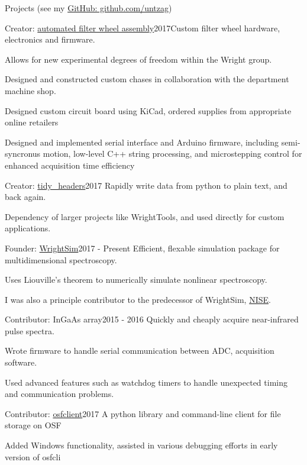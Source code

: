 \documentclass{resume}  %
\begin{document}
\begin{rSection}{Projects (see my \href{https://github.com/untzag}{GitHub: github.com/untzag})}
\begin{rSubsection}{Creator: \href{https://github.com/wright-group/FilterWheels}{automated filter
        wheel assembly}}{2017}{Custom filter wheel hardware, electronics and firmware.}{}
    \item Allows for new experimental degrees of freedom within the Wright group.
    \item Designed and constructed custom chases in collaboration with the department machine shop.
    \item Designed custom circuit board using KiCad, ordered supplies from appropriate online
      retailers
    \item Designed and implemented serial interface and Arduino firmware, including semi-syncronus
      motion, low-level C++ string processing, and microstepping control for enhanced acquisition
      time efficiency
  \end{rSubsection}
  \begin{rSubsection}{Creator: \href{https://github.com/untzag/tidy_headers}{tidy\_headers}}{2017}
    {Rapidly write data from python to plain text, and back again.}{}
    \item Dependency of larger projects like WrightTools, and used directly for custom
      applications.
  \end{rSubsection}
  \begin{rSubsection}{Founder: \href{https://github.com/wright-group/WrightSim}{WrightSim}}{2017 -
      Present}
    {Efficient, flexable simulation package for multidimensional spectroscopy.}{}
    \item Uses Liouville's theorem to numerically simulate nonlinear spectroscopy.
    \item I was also a principle contributor to the predecessor of WrightSim,
      \href{https://github.com/wright-group/NISE}{NISE}.
  \end{rSubsection}
  \begin{rSubsection}{Contributor: InGaAs array}{2015 - 2016}
    {Quickly and cheaply acquire near-infrared pulse spectra.}{}
    \item Wrote firmware to handle serial communication between ADC, acquisition software.
    \item Used advanced features such as watchdog timers to handle unexpected timing and
      communication problems.
  \end{rSubsection}
  \begin{rSubsection}{Contributor: \href{https://github.com/dib-lab/osf-cli}{osfclient}}{2017}
    {A python library and command-line client for file storage on OSF}{}
    \item Added Windows functionality, assisted in various debugging efforts in early version of
      osfcli
  \end{rSubsection}
\end{rSection}
\end{document}
